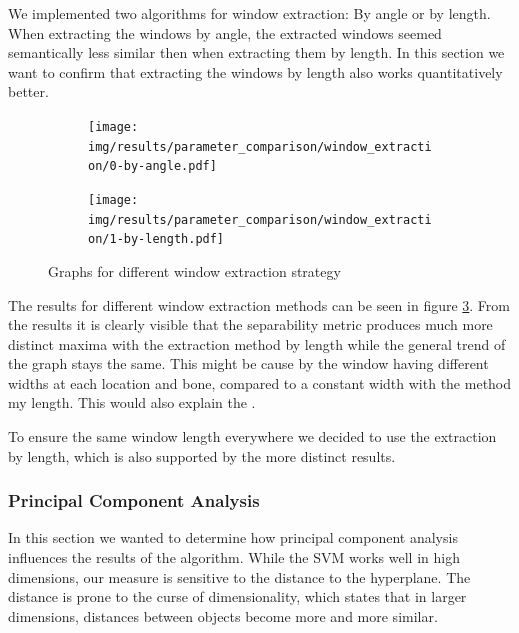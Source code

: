 \documentclass[pdftex,12pt,a4paper]{report}
\begin{document}
We implemented two algorithms for window extraction: By angle or by length. When extracting the windows by angle, the extracted windows seemed semantically less similar then when extracting them by length. In this section we want to confirm that extracting the windows by length also works quantitatively better.

\begin{figure}[h]
	\centering
	\begin{subfigure}[b]{0.32\textwidth}
		\centering
		\texttt{[image: img/results/parameter\_comparison/window\_extraction/0-by-angle.pdf]}
		\label{fig:window-extraction-graphs-0}
	\end{subfigure}
	\begin{subfigure}[b]{0.32\textwidth}
		\centering
		\texttt{[image: img/results/parameter\_comparison/window\_extraction/1-by-length.pdf]}
		\label{fig:window-extraction-graphs-1}
	\end{subfigure}
	\caption{Graphs for different window extraction strategy}
	\label{fig:window-extraction-graphs}
\end{figure}

The results for different window extraction methods can be seen in figure \ref{fig:window-extraction-graphs}. From the results it is clearly visible that the separability metric produces much more distinct maxima with the extraction method by length while the general trend of the graph stays the same. This might be cause by the window having different widths at each location and bone, compared to a constant width with the method my length. This would also explain the .

To ensure the same window length everywhere we decided to use the extraction by length, which is also supported by the more distinct results.

\subsubsection{Principal Component Analysis}

In this section we wanted to determine how principal component analysis influences the results of the algorithm. While the SVM works well in high dimensions, our measure is sensitive to the distance to the hyperplane. The distance is prone to the curse of dimensionality, which states that in larger dimensions, distances between objects become more and more similar.
\end{document}
